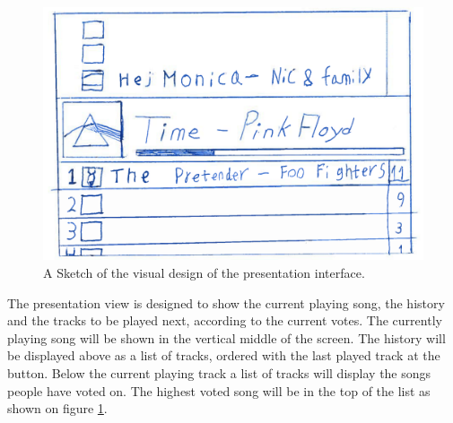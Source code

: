 \begin{figure}[hbtp]
  \centering
  \includegraphics[width=1.0\linewidth]{Images/presentationInterface.png}
  \caption{A Sketch of the visual design of the presentation interface.}\label{fig:presentation}
\end{figure}

The presentation view is designed to show the current playing song, the history and the tracks to be played next, according to the current votes. The currently playing song will be shown in the vertical middle of the screen. The history will be displayed above as a list of tracks, ordered with the last played track at the button. Below the current playing track a list of tracks will display the songs people have voted on. The highest voted song will be in the top of the list as shown on figure \cref{fig:presentation}. 




